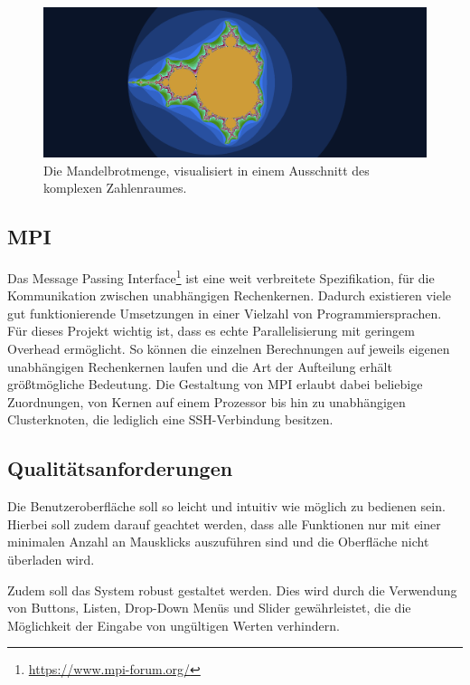 \begin{figure}
    \centering
        \includegraphics[width=0.9\linewidth]{img/Einleitung/Mandelbrot_visualization_example.png}
    \caption{Die Mandelbrotmenge, visualisiert in einem Ausschnitt des komplexen Zahlenraumes.}
    \label{fig:mandelbrot_visualisierung_beispiel}
\end{figure}

\subsection{MPI}

Das Message Passing Interface\footnote{\url{https://www.mpi-forum.org/}} ist eine weit verbreitete Spezifikation, für die Kommunikation zwischen unabhängigen Rechenkernen.
Dadurch existieren viele gut funktionierende Umsetzungen in einer Vielzahl von Programmiersprachen.
Für dieses Projekt wichtig ist, dass es echte Parallelisierung mit geringem Overhead ermöglicht.
So können die einzelnen Berechnungen auf jeweils eigenen unabhängigen Rechenkernen laufen und
die Art der Aufteilung erhält größtmögliche Bedeutung.
Die Gestaltung von MPI erlaubt dabei beliebige Zuordnungen, von Kernen auf einem Prozessor bis hin zu unabhängigen Clusterknoten, die lediglich eine SSH-Verbindung besitzen.



\subsection{Qualitätsanforderungen}

Die Benutzeroberfläche soll so leicht und intuitiv wie möglich zu bedienen sein. 
Hierbei soll zudem darauf geachtet werden, dass alle Funktionen nur mit einer minimalen 
Anzahl an Mausklicks auszuführen sind und die Oberfläche nicht überladen wird.

Zudem soll das System robust gestaltet werden.
Dies wird durch die Verwendung von Buttons, Listen, Drop-Down Menüs und Slider gewährleistet,
die die Möglichkeit der Eingabe von ungültigen Werten verhindern.

